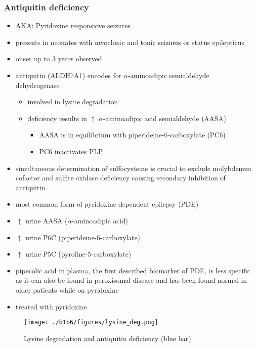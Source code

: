 \documentclass{scrartcl}
\begin{document}
\subsubsection{Antiquitin deficiency}
\label{sec:org3235be7}
\begin{itemize}
\item AKA: Pyridoxine responsiove seizures
\item presents in neonates with myoclonic and tonic seizures or
status epilepticus
\item onset up to 3 years observed
\item antiquitin (ALDH7A1) encodes for \(\alpha\)-aminoadipic semialdehyde dehydrogenase
\begin{itemize}
\item involved in lysine degradation
\item deficiency results in \(\uparrow\) \(\alpha\)-aminoadipic acid semialdehyde (AASA)
\begin{itemize}
\item AASA is in equilibrium with piperideine-6-carboxylate (PC6)
\item PC6 inactivates PLP
\end{itemize}
\end{itemize}
\item simultaneous determination of sulfocysteine is crucial to exclude
molybdenum cofactor and sulfite oxidase deficiency causing secondary
inhibition of antiquitin
\item most common form of pyridoxine dependent epilepsy (PDE)
\item \(\uparrow\) urine AASA (\(\alpha\)-aminoadipic acid)
\item \(\uparrow\) urine P6C (piperideine-6-carboxylate)
\item \(\uparrow\) urine P5C (pyroline-5-carboxylate)
\item pipecolic acid in plasma, the first described biomarker of PDE, is
less specific as it can also be found in peroxisomal disease and has
been found normal in older patients while on pyridoxine
\item treated with pyridoxine
\end{itemize}

\begin{figure}[htbp]
\centering
\texttt{[image: ./b1b6/figures/lysine\_deg.png]}
\caption{\label{fig:orgc802f7e}
Lysine degradation and antiquitin deficiency (blue bar)}
\end{figure}
\end{document}
